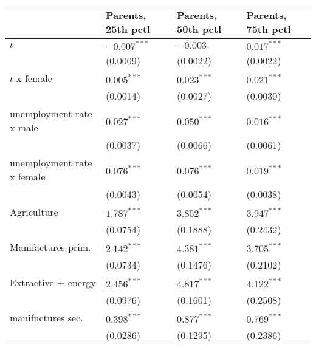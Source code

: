 \begin{tabular}{llll}
\toprule
{} & Parents, 25th pctl & Parents, 50th pctl & Parents, 75th pctl \\
\midrule
$t$                                                &     $-0.007^{***}$ &           $-0.003$ &      $0.017^{***}$ \\
                                                   &           (0.0009) &           (0.0022) &           (0.0022) \\
$t$ x female                                       &      $0.005^{***}$ &      $0.023^{***}$ &      $0.021^{***}$ \\
                                                   &           (0.0014) &           (0.0027) &           (0.0030) \\
unemployment rate x male                           &      $0.027^{***}$ &      $0.050^{***}$ &      $0.016^{***}$ \\
                                                   &           (0.0037) &           (0.0066) &           (0.0061) \\
unemployment rate x female                         &      $0.076^{***}$ &      $0.076^{***}$ &      $0.019^{***}$ \\
                                                   &           (0.0043) &           (0.0054) &           (0.0038) \\
Agriculture                                        &      $1.787^{***}$ &      $3.852^{***}$ &      $3.947^{***}$ \\
                                                   &           (0.0754) &           (0.1888) &           (0.2432) \\
Manifactures prim.                                 &      $2.142^{***}$ &      $4.381^{***}$ &      $3.705^{***}$ \\
                                                   &           (0.0734) &           (0.1476) &           (0.2102) \\
Extractive + energy                                &      $2.456^{***}$ &      $4.817^{***}$ &      $4.122^{***}$ \\
                                                   &           (0.0976) &           (0.1601) &           (0.2508) \\
manifuctures sec.                                  &      $0.398^{***}$ &      $0.877^{***}$ &      $0.769^{***}$ \\
                                                   &           (0.0286) &           (0.1295) &           (0.2386) \\

\end{tabular}
